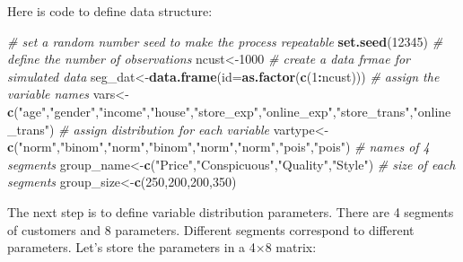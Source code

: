 \documentclass[12pt,]{krantz}
\makeatletter
\newenvironment{Shaded}{\begin{snugshade}}{\end{snugshade}}
\newcommand{\KeywordTok}[1]{\textcolor[rgb]{0.27,0.27,0.27}{\textbf{#1}}}
\newcommand{\DataTypeTok}[1]{\textcolor[rgb]{0.27,0.27,0.27}{#1}}
\newcommand{\DecValTok}[1]{\textcolor[rgb]{0.06,0.06,0.06}{#1}}
\newcommand{\StringTok}[1]{\textcolor[rgb]{0.5,0.5,0.5}{#1}}
\newcommand{\CommentTok}[1]{\textcolor[rgb]{0.37,0.37,0.37}{\textit{#1}}}
\newcommand{\OperatorTok}[1]{\textcolor[rgb]{0.43,0.43,0.43}{\textbf{#1}}}
\newcommand{\NormalTok}[1]{#1}
\newenvironment{kframe}{%
\medskip{}
\setlength{\fboxsep}{.8em}
 \def\at@end@of@kframe{}%
 \ifinner\ifhmode%
  \def\at@end@of@kframe{\end{minipage}}%
  \begin{minipage}{\columnwidth}%
 \fi\fi%
 \def\FrameCommand##1{\hskip\@totalleftmargin \hskip-\fboxsep
 \colorbox{shadecolor}{##1}\hskip-\fboxsep
     \hskip-\linewidth \hskip-\@totalleftmargin \hskip\columnwidth}%
 \MakeFramed {\advance\hsize-\width
   \@totalleftmargin\z@ \linewidth\hsize
   \@setminipage}}%
 {\par\unskip\endMakeFramed%
 \at@end@of@kframe}
\renewenvironment{Shaded}{\begin{kframe}}{\end{kframe}}
\theoremstyle{definition}
\theoremstyle{definition}
\theoremstyle{definition}
\theoremstyle{remark}
\makeatother
\begin{document}
Here is code to define data structure:

\begin{Shaded}
\begin{Highlighting}[]
\CommentTok{# set a random number seed to make the process repeatable}
\KeywordTok{set.seed}\NormalTok{(}\DecValTok{12345}\NormalTok{)}
\CommentTok{# define the number of observations}
\NormalTok{ncust<-}\DecValTok{1000}
\CommentTok{# create a data frmae for simulated data}
\NormalTok{seg_dat<-}\KeywordTok{data.frame}\NormalTok{(}\DataTypeTok{id=}\KeywordTok{as.factor}\NormalTok{(}\KeywordTok{c}\NormalTok{(}\DecValTok{1}\OperatorTok{:}\NormalTok{ncust)))}
\CommentTok{# assign the variable names}
\NormalTok{vars<-}\KeywordTok{c}\NormalTok{(}\StringTok{"age"}\NormalTok{,}\StringTok{"gender"}\NormalTok{,}\StringTok{"income"}\NormalTok{,}\StringTok{"house"}\NormalTok{,}\StringTok{"store_exp"}\NormalTok{,}\StringTok{"online_exp"}\NormalTok{,}\StringTok{"store_trans"}\NormalTok{,}\StringTok{"online_trans"}\NormalTok{)}
\CommentTok{# assign distribution for each variable}
\NormalTok{vartype<-}\KeywordTok{c}\NormalTok{(}\StringTok{"norm"}\NormalTok{,}\StringTok{"binom"}\NormalTok{,}\StringTok{"norm"}\NormalTok{,}\StringTok{"binom"}\NormalTok{,}\StringTok{"norm"}\NormalTok{,}\StringTok{"norm"}\NormalTok{,}\StringTok{"pois"}\NormalTok{,}\StringTok{"pois"}\NormalTok{)}
\CommentTok{# names of 4 segments}
\NormalTok{group_name<-}\KeywordTok{c}\NormalTok{(}\StringTok{"Price"}\NormalTok{,}\StringTok{"Conspicuous"}\NormalTok{,}\StringTok{"Quality"}\NormalTok{,}\StringTok{"Style"}\NormalTok{)}
\CommentTok{# size of each segments}
\NormalTok{group_size<-}\KeywordTok{c}\NormalTok{(}\DecValTok{250}\NormalTok{,}\DecValTok{200}\NormalTok{,}\DecValTok{200}\NormalTok{,}\DecValTok{350}\NormalTok{)}
\end{Highlighting}
\end{Shaded}

The next step is to define variable distribution parameters. There are 4
segments of customers and 8 parameters. Different segments correspond to
different parameters. Let's store the parameters in a 4×8 matrix:
\end{document}
